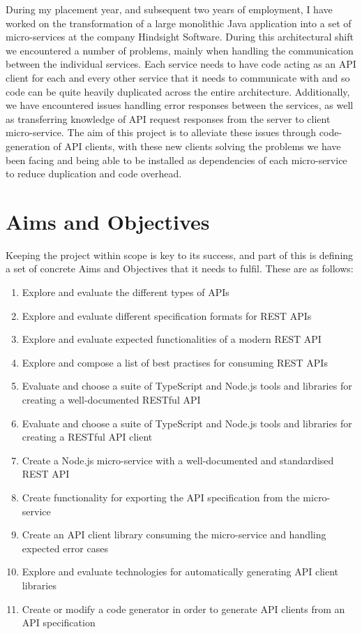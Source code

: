 During my placement year, and subsequent two years of employment, I  have worked on the transformation of a large monolithic Java application into a set of micro-services at the company Hindsight Software. During this architectural shift we encountered a number of problems, mainly when handling the communication between the individual services. Each service needs to have code acting as an API client for each and every other service that it needs to communicate with and so code can be quite heavily duplicated across the entire architecture. Additionally, we have encountered issues handling error responses between the services, as well as transferring knowledge of API request responses from the server to client micro-service. The aim of this project is to alleviate these issues through code-generation of API clients, with these new clients solving the problems we have been facing and being able to be installed as dependencies of each micro-service to reduce duplication and code overhead.

\section{Aims and Objectives}
Keeping the project within scope is key to its success, and part of this is defining a set of concrete Aims and Objectives that it needs to fulfil. These are as follows:

\begin{enumerate}
   \item Explore and evaluate the different types of APIs
   \item Explore and evaluate different specification formats for REST APIs
   \item Explore and evaluate expected functionalities of a modern REST API
   \item Explore and compose a list of best practises for consuming REST APIs
   \item Evaluate and choose a suite of TypeScript and Node.js tools and libraries for creating a well-documented RESTful API
   \item Evaluate and choose a suite of TypeScript and Node.js tools and libraries for creating a RESTful API client
   \item Create a Node.js micro-service with a well-documented and standardised REST API
   \item Create functionality for exporting the API specification from the micro-service
   \item Create an API client library consuming the micro-service and handling expected error cases
   \item Explore and evaluate technologies for automatically generating API client libraries
   \item Create or modify a code generator in order to generate API clients from an API specification
 \end{enumerate} 
